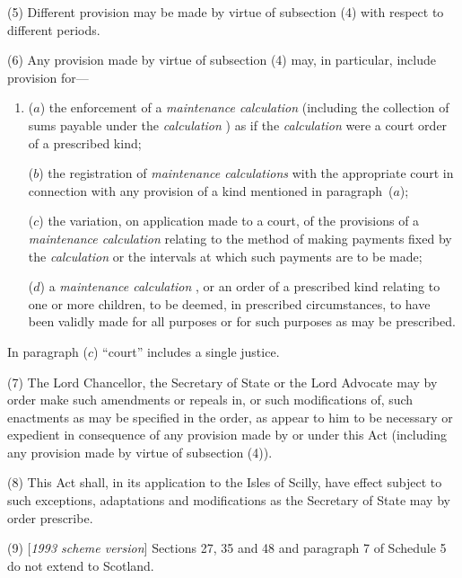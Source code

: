 \documentclass[12pt,a4paper]{article}
\begin{document}
(5) Different provision may be made by virtue of subsection (4)  with respect to different periods.

(6) Any provision made by virtue of subsection (4)  may, in particular, include provision for—
\begin{enumerate}\item[]
($a$) the enforcement of a 
\emph{maintenance calculation}  %
(including the collection of sums payable under the 
\emph{calculation}%
) as if the 
\emph{calculation}  %
were a court order of a prescribed kind;

($b$) the registration of 
\emph{maintenance calculations}  %
with the appropriate court in connection with any provision of a kind mentioned in paragraph~($a$);

($c$) the variation, on application made to a court, of the provisions of a 
\emph{maintenance calculation}  %
relating to the method of making payments fixed by the 
\emph{calculation}  %
or the intervals at which such payments are to be made;

($d$) a 
\emph{maintenance calculation}%
, or an order of a prescribed kind relating to one or more children, to be deemed, in prescribed circumstances, to have been validly made for all purposes or for such purposes as may be prescribed.
\end{enumerate}

In paragraph ($c$)  “court” includes a single justice.

(7) The Lord Chancellor, the Secretary of State or the Lord Advocate may by order make such amendments or repeals in, or such modifications of, such enactments as may be specified in the order, as appear to him to be necessary or expedient in consequence of any provision made by or under this Act (including any provision made by virtue of subsection (4)).

(8) This Act shall, in its application to the Isles of Scilly, have effect subject to such exceptions, adaptations and modifications as the Secretary of State may by order prescribe.

(9) [\emph{1993 scheme version}] Sections 27, 35 and 48 and paragraph 7 of Schedule 5 do not extend to Scotland.
\end{document}
